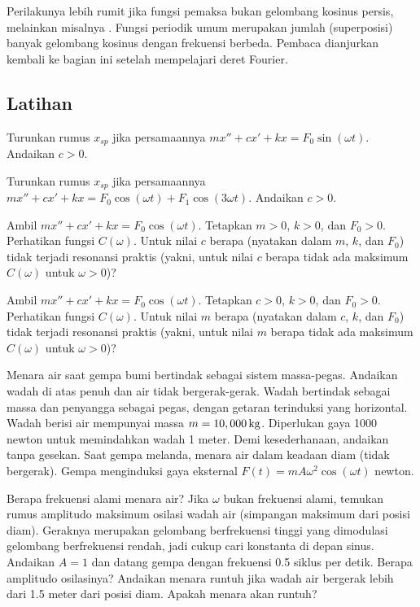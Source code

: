 Perilakunya lebih rumit jika fungsi pemaksa bukan gelombang kosinus persis, melainkan misalnya . Fungsi periodik umum merupakan jumlah (superposisi) banyak gelombang kosinus dengan frekuensi berbeda. Pembaca dianjurkan kembali ke bagian ini setelah mempelajari deret Fourier.

\subsection{Latihan}

\begin{exercise}
Turunkan rumus $x_{sp}$ jika persamaannya $m x'' + c x' + kx = F_0 \sin (\omega t)$. Andaikan $c > 0$.
\end{exercise}

\begin{exercise}
Turunkan rumus $x_{sp}$ jika persamaannya $m x'' + c x' + kx = F_0 \cos (\omega t) + F_1 \cos (3\omega t)$. Andaikan $c > 0$.
\end{exercise}

\begin{exercise}
Ambil $m x'' + c x' + kx = F_0 \cos (\omega t)$. Tetapkan $m > 0$, $k > 0$, dan $F_0 > 0$. Perhatikan fungsi $C(\omega)$. Untuk nilai $c$ berapa (nyatakan dalam $m$, $k$, dan $F_0$) tidak terjadi resonansi praktis (yakni, untuk nilai $c$ berapa tidak ada maksimum $C(\omega)$ untuk $\omega > 0$)?
\end{exercise}

\begin{exercise}
Ambil $m x'' + c x' + kx = F_0 \cos (\omega t)$. Tetapkan $c > 0$, $k > 0$, dan $F_0 > 0$. Perhatikan fungsi $C(\omega)$. Untuk nilai $m$ berapa (nyatakan dalam $c$, $k$, dan $F_0$) tidak terjadi resonansi praktis (yakni, untuk nilai $m$ berapa tidak ada maksimum $C(\omega)$ untuk $\omega > 0$)?
\end{exercise}

\begin{exercise}
\pagebreak[3]
Menara air saat gempa bumi bertindak sebagai sistem massa-pegas. Andaikan wadah di atas penuh dan air tidak bergerak-gerak. Wadah bertindak sebagai massa dan penyangga sebagai pegas, dengan getaran terinduksi yang horizontal. Wadah berisi air mempunyai massa $m=\unit[10,000]{kg}$. Diperlukan gaya 1000 newton untuk memindahkan wadah 1 meter. Demi kesederhanaan, andaikan tanpa gesekan. Saat gempa melanda, menara air dalam keadaan diam (tidak bergerak).
%
Gempa menginduksi gaya eksternal $F(t) = m A \omega^2 \cos (\omega t)$ newton.
\begin{tasks}
\task Berapa frekuensi alami menara air?
\task Jika $\omega$ bukan frekuensi alami, temukan rumus amplitudo maksimum osilasi wadah air (simpangan maksimum dari posisi diam). Geraknya merupakan gelombang berfrekuensi tinggi yang dimodulasi gelombang berfrekuensi rendah, jadi cukup cari konstanta di depan sinus.
\task Andaikan $A = 1$ dan datang gempa dengan frekuensi 0.5 siklus per detik. Berapa amplitudo osilasinya? Andaikan menara runtuh jika wadah air bergerak lebih dari 1.5 meter dari posisi diam. Apakah menara akan runtuh?
\end{tasks}
\end{exercise}


